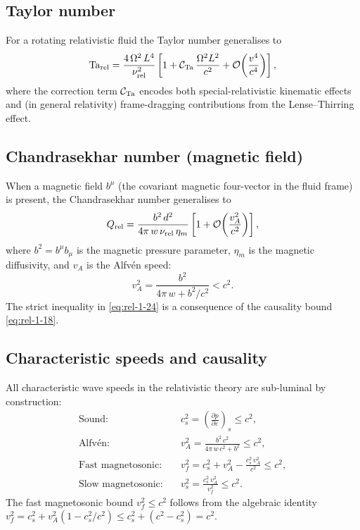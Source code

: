 \subsection{Taylor number}

For a rotating relativistic fluid the Taylor number generalises to
\begin{equation}
\label{eq:rel-1-22}
\mathrm{Ta}_{\rm rel}
  = \frac{4\,\Omega^{2}\,L^{4}}{\nu_{\rm rel}^{2}}
  \left[
    1 + \mathcal{C}_{\rm Ta}\,\frac{\Omega^{2}L^{2}}{c^{2}}
    + \mathcal{O}\!\left(\frac{v^{4}}{c^{4}}\right)
  \right],
\end{equation}
where the correction term $\mathcal{C}_{\rm Ta}$ encodes both
special-relativistic kinematic effects and (in general relativity)
frame-dragging contributions from the Lense--Thirring effect.

\subsection{Chandrasekhar number (magnetic field)}

When a magnetic field $b^{\mu}$ (the covariant magnetic four-vector in
the fluid frame) is present, the Chandrasekhar number generalises to
\begin{equation}
\label{eq:rel-1-23}
Q_{\rm rel}
  = \frac{b^{2}\,d^{2}}{4\pi\,w\,\nu_{\rm rel}\,\eta_m}
  \left[
    1 + \mathcal{O}\!\left(\frac{v_{A}^{2}}{c^{2}}\right)
  \right],
\end{equation}
where $b^{2}=b^{\mu}b_{\mu}$ is the magnetic pressure parameter,
$\eta_m$ is the magnetic diffusivity, and $v_{A}$ is the Alfv\'en
speed:
\begin{equation}
\label{eq:rel-1-24}
v_{A}^{2} = \frac{b^{2}}{4\pi\,w + b^{2}/c^{2}}
  < c^{2}.
\end{equation}
The strict inequality in \eqref{eq:rel-1-24} is a consequence of the
causality bound \eqref{eq:rel-1-18}.

\subsection{Characteristic speeds and causality}
\label{sec:rel-1-4f}

All characteristic wave speeds in the relativistic theory are
sub-luminal by construction:
\begin{align}
\text{Sound:} &\quad c_{s}^{2}
  = \left(\frac{\partial p}{\partial\varepsilon}\right)_{\!s}
  \leq c^{2},
\label{eq:rel-1-25}\\[4pt]
\text{Alfv\'en:} &\quad v_{A}^{2}
  = \frac{b^{2}\,c^{2}}{4\pi\,w\,c^{2}+b^{2}} \leq c^{2},
\label{eq:rel-1-26}\\[4pt]
\text{Fast magnetosonic:} &\quad v_{f}^{2}
  = c_{s}^{2}+v_{A}^{2}-\frac{c_{s}^{2}\,v_{A}^{2}}{c^{2}}
  \leq c^{2},
\label{eq:rel-1-27}\\[4pt]
\text{Slow magnetosonic:} &\quad v_{s}^{2}
  = \frac{c_{s}^{2}\,v_{A}^{2}}{v_{f}^{2}}
  \leq c^{2}.
\label{eq:rel-1-28}
\end{align}
The fast magnetosonic bound $v_f^2\leq c^2$ follows from the
algebraic identity
$v_f^2 = c_s^2+v_A^2(1-c_s^2/c^2) \leq c_s^2+(c^2-c_s^2)=c^2$.

